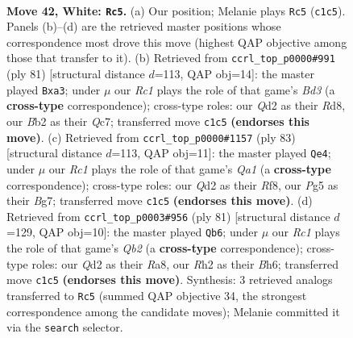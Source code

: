 \documentclass[11pt]{article}
\begin{document}
\clearpage

\begin{figure}[p]\centering
\begin{subfigure}{0.46\textwidth}\centering
\resizebox{\linewidth}{!}{%
\newchessgame
\chessboard[
  setfen={rn1qkb1r/4n3/2p3p1/3p2P1/3P1PNp/1P5P/1B1QB2R/2R3K1 w - - 13 42},
  showmover=false,
  pgfstyle=straightmove, color=movearrow, markmove={c1-c5}
]}
\caption{}
\end{subfigure}\hfill
\begin{subfigure}{0.46\textwidth}\centering
\resizebox{\linewidth}{!}{%
\newchessgame
\chessboard[
  setfen={1r1r3k/2q4p/2pb1p2/p3pP1p/5n1P/P1P3R1/2QN1PP1/3R1BK1 b - - 0 41},
  showmover=false,
  pgfstyle=straightmove, color=movearrow, markmove={d6-a3}
]}
\caption{}
\end{subfigure}
\\[4pt]
\begin{subfigure}{0.46\textwidth}\centering
\resizebox{\linewidth}{!}{%
\newchessgame
\chessboard[
  setfen={q4r2/p5bk/P2RPnpp/2p5/1p3P2/5N1P/1P4P1/1Q4NK b - - 0 42},
  showmover=false,
  pgfstyle=straightmove, color=movearrow, markmove={a8-e4}
]}
\caption{}
\end{subfigure}\hfill
\begin{subfigure}{0.46\textwidth}\centering
\resizebox{\linewidth}{!}{%
\newchessgame
\chessboard[
  setfen={r7/1q2kp2/b2p3b/p2Pp2P/1n2P3/1PN3R1/3R4/1KNQ4 b - - 1 41},
  showmover=false,
  pgfstyle=straightmove, color=movearrow, markmove={b7-b6}
]}
\caption{}
\end{subfigure}
\caption{\textbf{Move 42, White: \texttt{Rc5}.} (a) Our position; Melanie plays \texttt{Rc5} (\texttt{c1c5}). Panels (b)--(d) are the retrieved master positions whose correspondence most drove this move (highest QAP objective among those that transfer to it). (b) Retrieved from \texttt{ccrl\_top\_p0000\#991} (ply 81) [structural distance $d$=113, QAP obj=14]: the master played \texttt{Bxa3}; under $\mu$ our \emph{Rc1} plays the role of that game's \emph{Bd3} (a \textbf{cross-type} correspondence); cross-type roles: our \emph{Q}d2 as their \emph{R}d8, our \emph{B}b2 as their \emph{Q}c7; transferred move \texttt{c1c5} \textbf{(endorses this move)}. (c) Retrieved from \texttt{ccrl\_top\_p0000\#1157} (ply 83) [structural distance $d$=113, QAP obj=11]: the master played \texttt{Qe4}; under $\mu$ our \emph{Rc1} plays the role of that game's \emph{Qa1} (a \textbf{cross-type} correspondence); cross-type roles: our \emph{Q}d2 as their \emph{R}f8, our \emph{P}g5 as their \emph{B}g7; transferred move \texttt{c1c5} \textbf{(endorses this move)}. (d) Retrieved from \texttt{ccrl\_top\_p0003\#956} (ply 81) [structural distance $d$=129, QAP obj=10]: the master played \texttt{Qb6}; under $\mu$ our \emph{Rc1} plays the role of that game's \emph{Qb2} (a \textbf{cross-type} correspondence); cross-type roles: our \emph{Q}d2 as their \emph{R}a8, our \emph{R}h2 as their \emph{B}h6; transferred move \texttt{c1c5} \textbf{(endorses this move)}. Synthesis: 3 retrieved analogs transferred to \texttt{Rc5} (summed QAP objective 34, the strongest correspondence among the candidate moves); Melanie committed it via the \texttt{search} selector.}
\label{fig:thought-m82}
\end{figure}
\end{document}

